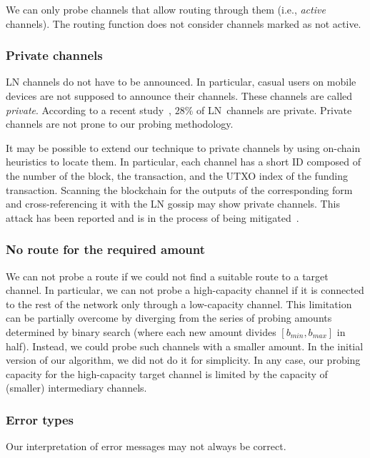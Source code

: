 We can only probe channels that allow routing through them (i.e., \textit{active} channels).
The routing function does not consider channels marked as not active.

\subsubsection{Private channels}

LN channels do not have to be announced.
In particular, casual users on mobile devices are not supposed to announce their channels.
These channels are called \textit{private}.
According to a recent study~\cite{BitMEXPrivateChannels}, $28\%$ of LN~channels are private.
Private channels are not prone to our probing methodology.

It may be possible to extend our technique to private channels by using on-chain heuristics to locate them.
In particular, each channel has a short ID composed of the number of the block, the transaction, and the UTXO index of the funding transaction.
Scanning the blockchain for the outputs of the corresponding form and cross-referencing it with the LN gossip may show private channels.
This attack has been reported and is in the process of being mitigated~\cite{Pickhardt2020}.

\subsubsection{No route for the required amount}

We can not probe a route if we could not find a suitable route to a target channel.
In particular, we can not probe a high-capacity channel if it is connected to the rest of the network only through a low-capacity channel.
This limitation can be partially overcome by diverging from the series of probing amounts determined by binary search (where each new amount divides $[b_{min}, b_{max}]$ in half).
Instead, we could probe such channels with a smaller amount.
In the initial version of our algorithm, we did not do it for simplicity.
In any case, our probing capacity for the high-capacity target channel is limited by the capacity of (smaller) intermediary channels.


\subsubsection{Error types}

Our interpretation of error messages may not always be correct.

